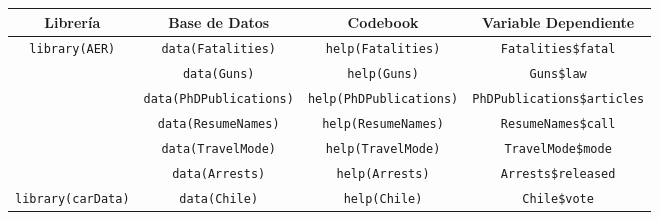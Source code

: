 \documentclass[10pt]{article}
\begin{document}
\begin{table}[ph!]
\begin{center}
\begin{scriptsize}
{\renewcommand{\arraystretch}{2}%
\begin{tabular}{  c |  c | c | c }
\toprule
\textbf{Librer\'ia}             & \textbf{Base de Datos}  & \textbf{Codebook} & \textbf{Variable Dependiente} \\
\midrule
\multirow{6}{*}{\texttt{library(AER)}}  & \texttt{data(Fatalities)}          & \texttt{help(Fatalities)}          & \texttt{Fatalities\$fatal}          \\\cline{2-4}
                                        & \texttt{data(Guns)}                & \texttt{help(Guns)}                & \texttt{Guns\$law}                  \\\cline{2-4}
                                        & \texttt{data(PhDPublications)}     & \texttt{help(PhDPublications)}     & \texttt{PhDPublications\$articles}  \\\cline{2-4}
                                        & \texttt{data(ResumeNames)}         & \texttt{help(ResumeNames)}         & \texttt{ResumeNames\$call}          \\\cline{2-4}
                                        & \texttt{data(TravelMode)}          & \texttt{help(TravelMode)}          & \texttt{TravelMode\$mode}          \\\cline{2-4}
                                        & \texttt{data(Arrests)}             & \texttt{help(Arrests)}             & \texttt{Arrests\$released}          \\\cline{2-4}
\hline
\multirow{1}{*}{\texttt{library(carData)}}  & \texttt{data(Chile)}               & \texttt{help(Chile)}          & \texttt{Chile\$vote}          \\\cline{2-4}
\bottomrule
\end{tabular}}
\end{scriptsize}
\end{center}
\end{table}
\end{document}

